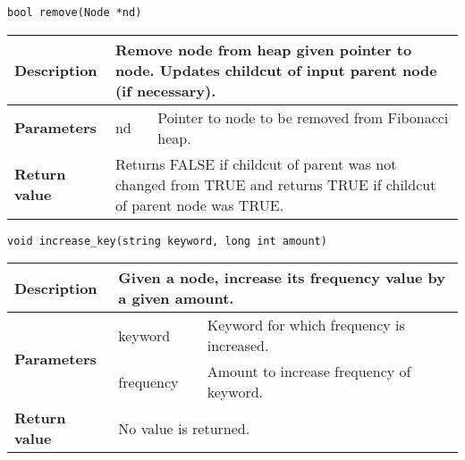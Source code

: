 \documentclass[12pt, reqno]{amsart}
\begin{document}
{\large \texttt{bool remove(Node *nd)}}
\begin{center}
    \begin{tabular}{| l | p{2.5cm} | p{9.5cm} |}
    \hline
    {\bfseries Description} & \multicolumn{2}{p{12.5cm}|}{Remove node from heap given pointer to node. Updates childcut of input parent node (if necessary).} \\ \hline
    \multirow{1}{*}{\bfseries Parameters} & nd & Pointer to node to be removed from Fibonacci heap. \\ \hline
    {\bfseries Return value} & \multicolumn{2}{p{12.5cm}|}{Returns FALSE if childcut of parent was not changed from TRUE and returns TRUE if childcut of parent node was TRUE.} \\ \hline
    \end{tabular}
\end{center}
    
{\large \texttt{void increase\_key(string keyword, long int amount)}}
\begin{center}
    \begin{tabular}{| l | p{2.5cm} | p{9.5cm} |}
    \hline
    {\bfseries Description} & \multicolumn{2}{p{12.5cm}|}{Given a node, increase its frequency value by a given amount.} \\ \hline
    \multirow{2}{*}{\bfseries Parameters} & keyword & Keyword for which frequency is increased. \\ \cline{2-3}
    & frequency & Amount to increase frequency of keyword. \\ \hline
    {\bfseries Return value} & \multicolumn{2}{p{12.5cm}|}{No value is returned.} \\ \hline
    \end{tabular}
\end{center}
\end{document}
